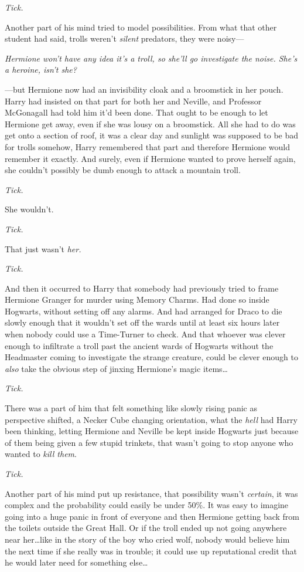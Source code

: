 \emph{Tick.}

Another part of his mind tried to model possibilities. From what that other student had said, trolls weren’t \emph{silent} predators, they were noisy—

\emph{Hermione won’t have any idea it’s a troll, so she’ll go investigate the noise. She’s a heroine, isn’t she?}

—but Hermione now had an invisibility cloak and a broomstick in her pouch. Harry had insisted on that part for both her and Neville, and Professor McGonagall had told him it’d been done. That ought to be enough to let Hermione get away, even if she was lousy on a broomstick. All she had to do was get onto a section of roof, it was a clear day and sunlight was supposed to be bad for trolls somehow, Harry remembered that part and therefore Hermione would remember it exactly. And surely, even if Hermione wanted to prove herself again, she couldn’t possibly be dumb enough to attack a mountain troll.

\emph{Tick.}

She wouldn’t.

\emph{Tick.}

That just wasn’t \emph{her.}

\emph{Tick.}

And then it occurred to Harry that somebody had previously tried to frame Hermione Granger for murder using Memory Charms. Had done so inside Hogwarts, without setting off any alarms. And had arranged for Draco to die slowly enough that it wouldn’t set off the wards until at least six hours later when nobody could use a Time-Turner to check. And that whoever was clever enough to infiltrate a troll past the ancient wards of Hogwarts without the Headmaster coming to investigate the strange creature, could be clever enough to \emph{also} take the obvious step of jinxing Hermione’s magic items…

\emph{Tick.}

There was a part of him that felt something like slowly rising panic as perspective shifted, a Necker Cube changing orientation, what the \emph{hell} had Harry been thinking, letting Hermione and Neville be kept inside Hogwarts just because of them being given a few stupid trinkets, that wasn’t going to stop anyone who wanted to \emph{kill them}.

\emph{Tick.}

Another part of his mind put up resistance, that possibility wasn’t \emph{certain}, it was complex and the probability could easily be under 50\%. It was easy to imagine going into a huge panic in front of everyone and then Hermione getting back from the toilets outside the Great Hall. Or if the troll ended up not going anywhere near her…like in the story of the boy who cried wolf, nobody would believe him the next time if she really was in trouble; it could use up reputational credit that he would later need for something else…


